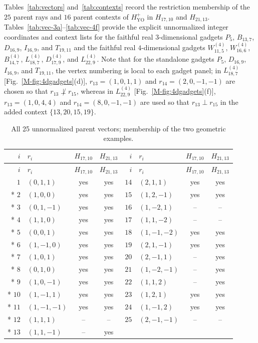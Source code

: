 \documentclass[aps,pra,reprint,superscriptaddress,longbibliography,nofootinbib,floatfix,10pt]{revtex4-2}
\theoremstyle{definition}
\newcommand{\YO}{\mathrm{YO}}
\begin{document}
Tables~\ref{tab:vectors} and~\ref{tab:contexts} record the restriction membership of the $25$ parent rays and $16$ parent contexts of $H_{\YO}^{+}$ in $H_{17,10}$ and $H_{21,13}$. Tables~\ref{tab:vec-3a}--\ref{tab:vec-4f} provide the explicit unnormalized integer coordinates and context lists for the faithful real $3$-dimensional gadgets $P_5$, $B_{13,7}$, $D_{16,9}$, $I_{16,9}$, and $T_{19,11}$ and the faithful real $4$-dimensional gadgets $W_{11,5}^{(4)}$, $W_{16,6}^{(4)}$, $B_{14,7}^{(4)}$, $L_{18,7}^{(4)}$, $D_{17,9}^{(4)}$, and $L_{22,9}^{(4)}$. Note that for the standalone gadgets $P_5$, $D_{16,9}$, $I_{16,9}$, and $T_{19,11}$, the vertex numbering is local to each gadget panel; in $L_{18,7}^{(4)}$ [Fig.~\ref{M-fig:4dgadgets}(d)], $r_{13}=(1,0,1,1)$ and $r_{14}=(2,0,-1,-1)$ are chosen so that $r_{13}\not\perp r_{15}$, whereas in $L_{22,9}^{(4)}$ [Fig.~\ref{M-fig:4dgadgets}(f)], $r_{13}=(1,0,4,4)$ and $r_{14}=(8,0,-1,-1)$ are used so that $r_{13}\perp r_{15}$ in the added context $\{13,20,15,19\}$.

\begingroup\small\setlength{\LTpre}{6pt}\setlength{\LTpost}{8pt}
\begin{longtable}{rlcc@{\qquad}rlcc}
\caption{All 25 unnormalized parent vectors; membership of the two geometric examples.}\label{tab:vectors}\label{tab:yo-core-vectors}\\
\toprule $i$ & $r_i$ & $H_{17,10}$ & $H_{21,13}$ & $i$ & $r_i$ & $H_{17,10}$ & $H_{21,13}$\\\midrule
\endfirsthead
\toprule $i$ & $r_i$ & $H_{17,10}$ & $H_{21,13}$ & $i$ & $r_i$ & $H_{17,10}$ & $H_{21,13}$\\\midrule
\endhead
\bottomrule\endfoot
$1$ & $(0,1,1)$ & yes & yes & $14$ & $(2,1,1)$ & yes & yes\\*
$2$ & $(1,0,0)$ & yes & yes & $15$ & $(1,2,-1)$ & yes & yes\\*
$3$ & $(0,1,-1)$ & yes & yes & $16$ & $(1,-2,1)$ & -- & --\\*
$4$ & $(1,1,0)$ & yes & yes & $17$ & $(1,1,-2)$ & -- & --\\*
$5$ & $(0,0,1)$ & yes & yes & $18$ & $(1,-1,-2)$ & yes & yes\\*
$6$ & $(1,-1,0)$ & yes & yes & $19$ & $(2,1,-1)$ & yes & yes\\*
$7$ & $(1,0,1)$ & yes & yes & $20$ & $(2,-1,1)$ & -- & yes\\*
$8$ & $(0,1,0)$ & yes & yes & $21$ & $(1,-2,-1)$ & -- & yes\\*
$9$ & $(1,0,-1)$ & yes & yes & $22$ & $(1,1,2)$ & -- & yes\\*
$10$ & $(1,-1,1)$ & yes & yes & $23$ & $(1,2,1)$ & yes & yes\\*
$11$ & $(1,-1,-1)$ & yes & yes & $24$ & $(1,-1,2)$ & yes & yes\\*
$12$ & $(1,1,1)$ & -- & -- & $25$ & $(2,-1,-1)$ & -- & --\\*
$13$ & $(1,1,-1)$ & -- & yes &  &  &  & \\
\end{longtable}\endgroup
\end{document}
